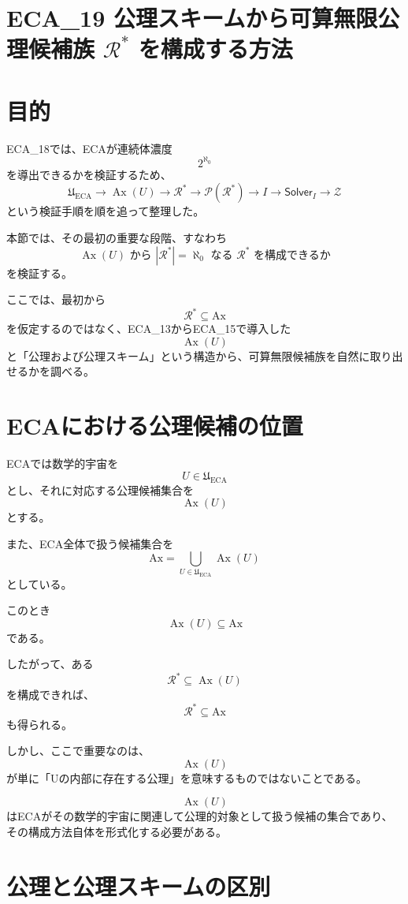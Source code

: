 \documentclass[a4paper,11pt]{article}
\newcommand{\Ax}{\mathrm{Ax}}
\newcommand{\Solver}{\mathsf{Solver}}
\begin{document}
\section{ECA_19 公理スキームから可算無限公理候補族 $\mathcal{R}^*$ を構成する方法}


\section{目的}

ECA_18では、ECAが連続体濃度
\[
2^{\aleph_0}
\]
を導出できるかを検証するため、
\[
\mathfrak U_{\mathrm{ECA}}
\to
\operatorname{Ax}(U)
\to
\mathcal{R}^*
\to
\mathcal P(\mathcal{R}^*)
\to
I
\to
\Solver_I
\to
\mathcal Z
\]
という検証手順を順を追って整理した。

本節では、その最初の重要な段階、すなわち
\[
\boxed{
\operatorname{Ax}(U)
\text{ から }
|\mathcal{R}^*|=\aleph_0
\text{ なる }
\mathcal{R}^*
\text{ を構成できるか}
}
\]
を検証する。

ここでは、最初から
\[
\mathcal{R}^*\subseteq\Ax
\]
を仮定するのではなく、ECA_13からECA_15で導入した
\[
\operatorname{Ax}(U)
\]
と「公理および公理スキーム」という構造から、可算無限候補族を自然に取り出せるかを調べる。

\section{ECAにおける公理候補の位置}

ECAでは数学的宇宙を
\[
U\in\mathfrak U_{\mathrm{ECA}}
\]
とし、それに対応する公理候補集合を
\[
\operatorname{Ax}(U)
\]
とする。

また、ECA全体で扱う候補集合を
\[
\Ax
=
\bigcup_{U\in\mathfrak U_{\mathrm{ECA}}}
\operatorname{Ax}(U)
\]
としている。

このとき
\[
\operatorname{Ax}(U)\subseteq\Ax
\]
である。

したがって、ある
\[
\mathcal{R}^*\subseteq\operatorname{Ax}(U)
\]
を構成できれば、
\[
\mathcal{R}^*\subseteq\Ax
\]
も得られる。

しかし、ここで重要なのは、
\[
\operatorname{Ax}(U)
\]
が単に「Uの内部に存在する公理」を意味するものではないことである。

\[
\operatorname{Ax}(U)
\]
はECAがその数学的宇宙に関連して公理的対象として扱う候補の集合であり、その構成方法自体を形式化する必要がある。

\section{公理と公理スキームの区別}
\end{document}
